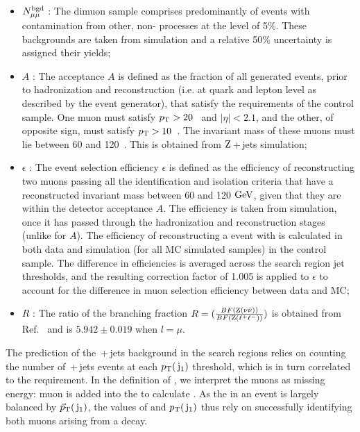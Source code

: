 \begin{itemize}

\item $ N^{\rm bgd}_{\mu\mu}$ : The dimuon sample comprises predominantly of \zmumu{} events with contamination from other, non-\zmumubr{} processes at the level of 5\%. These backgrounds are taken from simulation and a relative 50\% uncertainty is assigned their yields; 

\item $A$ : The acceptance $A$ is defined as the fraction of all generated events, prior to hadronization and reconstruction 
(i.e. at quark and lepton level as described by the event generator), that satisfy the requirements of the control sample. 
One muon must satisfy $p_{\text{T}} > 20$~\GeV{} and $|\eta| < 2.1$, and the other, of opposite sign, must satisfy $p_{\text{T}} > 10$~\GeV{}. The invariant mass of these muons must lie between 60 \GeV{} and 120~\GeV{}. This is obtained from $\mathrm{Z}${}\,+\,jets simulation;

\item $\epsilon$ : The event selection efficiency $\epsilon$ is defined as the efficiency of reconstructing two muons passing all the identification and isolation criteria that have a reconstructed invariant mass between 60 and 120 $\mathrm{GeV}$, given that they are within the detector acceptance $A$. 
The efficiency is taken from simulation, once it has passed through the hadronization and reconstruction stages (unlike for $A$).
%
The efficiency of reconstructing a \zmumubr{} event with  is calculated in both data and simulation (for all MC simulated samples) in the \zmumu{} control sample. The difference in efficiencies is averaged across the search region jet \pt{} thresholds, and the resulting correction factor of 1.005 is applied to $\epsilon$ to account for the difference in muon selection efficiency between data and MC;

\item $R$ : The ratio of the branching fraction $R = (\frac{BF(\mathrm{Z} ( \nu \bar{\nu} ))}{BF(\mathrm{Z} ( \ell^{+} \ell^{-} ))})$ is obtained from Ref.~\cite{PDG} and 
   is $5.942\pm 0.019$ when $l=\mu$. 
\end{itemize}
 
The prediction of the \znunubr{}\,+\,jets background in the search regions relies on counting the number of 
\zmumubr{}\,+\,jets events at each $p_{\text{T}}(\,\mathrm{j}_1)$ threshold, which is in turn
correlated to the \METmu requirement.
In the definition of \METmu, we interpret the muons as missing energy: 
muon \ptv is added into the \METv to calculate \METvmu.
As the \METvmu in an event is largely balanced by $\vec{p}_{\text{T}}(\,\mathrm{j}_1)$, 
the values of \METmu and $p_{\text{T}}(\,\mathrm{j}_1)$ thus rely on successfully 
identifying both muons arising from a \zmumu decay. 

